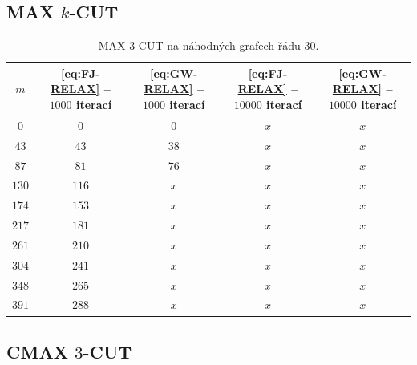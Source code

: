 \subsection{MAX $k$-CUT}

\begin{table}[h!]
    \begin{center}
        \begin{tabular}{ c | c c c c }
        $m$    & \ref{eq:FJ-RELAX} -- $1000$ iterací & \ref{eq:GW-RELAX}  -- $1000$ iterací & \ref{eq:FJ-RELAX} -- $10000$ iterací & \ref{eq:GW-RELAX}  -- $10000$ iterací \\
        \hline
        $0$   & $0$   & $0$  & $x$ & $x$ \\
        $43$  & $43$  & $38$ & $x$ & $x$ \\
        $87$  & $81$  & $76$ & $x$ & $x$ \\
        $130$ & $116$ & $x$  & $x$ & $x$ \\
        $174$ & $153$ & $x$  & $x$ & $x$ \\
        $217$ & $181$ & $x$  & $x$ & $x$ \\
        $261$ & $210$ & $x$  & $x$ & $x$ \\
        $304$ & $241$ & $x$  & $x$ & $x$ \\
        $348$ & $265$ & $x$  & $x$ & $x$ \\
        $391$ & $288$ & $x$  & $x$ & $x$ \\
        \end{tabular}
    \end{center}
    \caption{MAX $3$-CUT na náhodných grafech řádu $30$.}
    \label{tab:cycles_theta}
\end{table}

\subsection{CMAX $3$-CUT}




